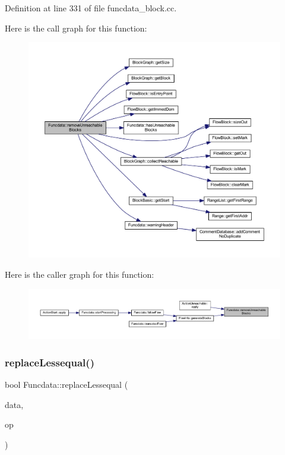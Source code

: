 Definition at line 331 of file funcdata\+\_\+block.\+cc.

Here is the call graph for this function\+:
\nopagebreak
\begin{figure}[H]
\begin{center}
\leavevmode
\includegraphics[width=350pt]{class_funcdata_a0fca3088c3d01a584aef0db49dfccc63_cgraph}
\end{center}
\end{figure}
Here is the caller graph for this function\+:
\nopagebreak
\begin{figure}[H]
\begin{center}
\leavevmode
\includegraphics[width=350pt]{class_funcdata_a0fca3088c3d01a584aef0db49dfccc63_icgraph}
\end{center}
\end{figure}
\mbox{\label{class_funcdata_a8af7249a90794ba6001046e28c0aeb5c}} 
\subsubsection{\texorpdfstring{replaceLessequal()}{replaceLessequal()}}
{\footnotesize\ttfamily bool Funcdata\+::replace\+Lessequal (\begin{DoxyParamCaption}\item[{\mbox{\hyperlink{class_funcdata}{Funcdata}} \&}]{data,  }\item[{\mbox{\hyperlink{class_pcode_op}{Pcode\+Op}} $\ast$}]{op }\end{DoxyParamCaption})\hspace{0.3cm}{\ttfamily [static]}}




